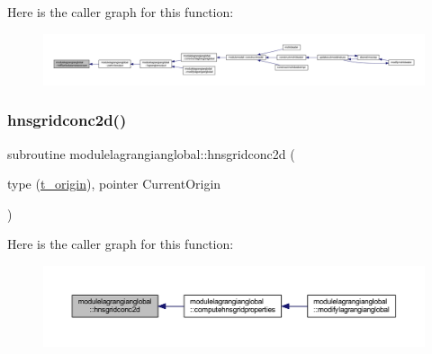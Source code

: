 Here is the caller graph for this function\+:\nopagebreak
\begin{figure}[H]
\begin{center}
\leavevmode
\includegraphics[width=350pt]{namespacemodulelagrangianglobal_ac7151a37e939cec76ecc163750973cfc_icgraph}
\end{center}
\end{figure}
\mbox{\label{namespacemodulelagrangianglobal_aebb9bea8e1ba0060251e687c3050561e}} 
\subsubsection{\texorpdfstring{hnsgridconc2d()}{hnsgridconc2d()}}
{\footnotesize\ttfamily subroutine modulelagrangianglobal\+::hnsgridconc2d (\begin{DoxyParamCaption}\item[{type (\mbox{\hyperlink{structmodulelagrangianglobal_1_1t__origin}{t\+\_\+origin}}), pointer}]{Current\+Origin }\end{DoxyParamCaption})\hspace{0.3cm}{\ttfamily [private]}}

Here is the caller graph for this function\+:\nopagebreak
\begin{figure}[H]
\begin{center}
\leavevmode
\includegraphics[width=350pt]{namespacemodulelagrangianglobal_aebb9bea8e1ba0060251e687c3050561e_icgraph}
\end{center}
\end{figure}
\mbox{\label{namespacemodulelagrangianglobal_a8c236ab2fa5219dffb9444c1ed075d48}} 
